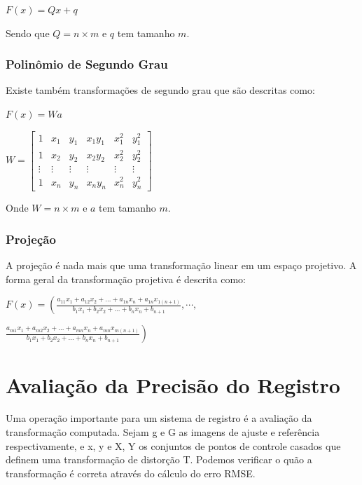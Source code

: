\documentclass[9pt, a4paper, nofonttune, journal]{IEEEtran}
\begin{document}
\begin{center}
$F(x)=Qx+q$\end{center}
Sendo que $Q=n\times m$ e $q$ tem tamanho $m$. \cite{CGPPBook1}

\subsubsection{Polinômio de Segundo Grau}
Existe também transformações de segundo grau que são descritas como:
\begin{center}
$F(x)=Wa$\end{center}

\begin{center}
$W=\begin{bmatrix}1 & x_{1} & y_{1} & x_{1}y_{1} & x_{1}^{2} & y_{1}^{2}\\
1 & x_{2} & y_{2} & x_{2}y_{2} & x_{2}^{2} & y_{2}^{2}\\
\vdots & \vdots & \vdots & \vdots & \vdots & \vdots\\
1 & x_{n} & y_{n} & x_{n}y_{n} & x_{n}^{2} & y_{n}^{2}
\end{bmatrix}$\end{center}
Onde $W=n\times m$ e $a$ tem tamanho $m$.\cite{Schowengerdt}

\subsubsection{Projeção}

A projeção é nada mais que uma transformação linear em um espaço projetivo.\cite{CGPPBook1}
A forma geral da transformação projetiva é descrita como:

$F(x)=\left( \frac{a_{11}x_{1}+a_{12}x_{2}+...+a_{1n}x_{n}+a_{1n}x_{1(n+1)}}{b_{1}x_{1}+b_{2}x_{2}+...+b_{n}x_{n}+b_{n+1}},\cdots,\right.$

\begin{center}
$\left. \frac{a_{m1}x_{1}+a_{m2}x_{2}+...+a_{mn}x_{n}+a_{mn}x_{m(n+1)}}{b_{1}x_{1}+b_{2}x_{2}+...+b_{n}x_{n}+b_{n+1}} \right)$\end{center}





\section{Avaliação da Precisão do Registro}
Uma operação importante para um sistema de registro é a avaliação da transformação computada. Sejam {g} e {G} as imagens de ajuste e referência respectivamente, e {x, y} e {X, Y} os conjuntos de pontos de controle casados que definem uma transformação de distorção {T}. Podemos verificar o quão a transformação é correta através do cálculo do erro RMSE.
\end{document}

